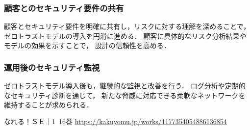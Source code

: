 \documentclass[titlepage,a4paper]{jsarticle}
\begin{document}
\subsubsection{顧客とのセキュリティ要件の共有}
顧客とセキュリティ要件を明確に共有し，リスクに対する理解を深めることで，
ゼロトラストモデルの導入を円滑に進める．
顧客に具体的なリスク分析結果やモデルの効果を示すことで，
設計の信頼性を高める．

\subsubsection{運用後のセキュリティ監視}
ゼロトラストモデル導入後も，継続的な監視と改善を行う．
ログ分析や定期的なセキュリティ診断を通じて，
新たな脅威に対応できる柔軟なネットワークを維持することが求められる．
\newpage
\begin{thebibliography}{99}
  なれる！ＳＥ｜1~16巻 \url{https://kakuyomu.jp/works/1177354054886136854}
\end{thebibliography}
\end{document}
